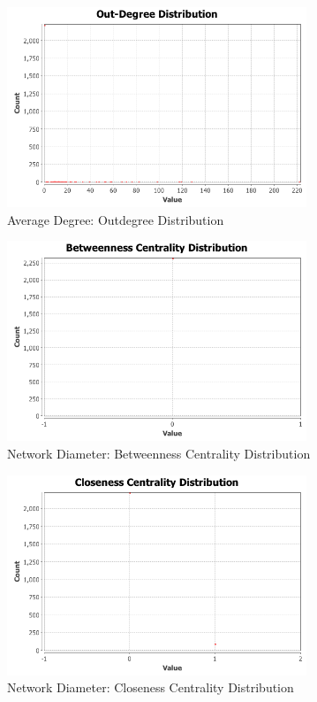 \documentclass[letterpaper,11pt]{article}
\begin{document}
\begin{figure}[!ht]
\centering
\includegraphics[width=0.8\textwidth]{Q3/AverageDegree/outdegree-distribution.png}
\caption{Average Degree: Outdegree Distribution}
\label{fig:Average Degree: Outdegree distribution}
\end{figure}

\begin{figure}[!ht]
\centering
\includegraphics[width=0.8\textwidth]{Q3/NetworkDiameter/Betweenness Centrality Distribution.png}
\caption{Network Diameter: Betweenness Centrality Distribution}
\label{fig:Network Diameter Betweenness Centrality Distribution}
\end{figure}


\begin{figure}[!ht]
\centering
\includegraphics[width=0.8\textwidth]{Q3/NetworkDiameter/Closeness Centrality Distribution.png}
\caption{Network Diameter: Closeness Centrality Distribution}
\label{fig:Network Diameter Closeness Centrality Distribution}
\end{figure}
\end{document}
